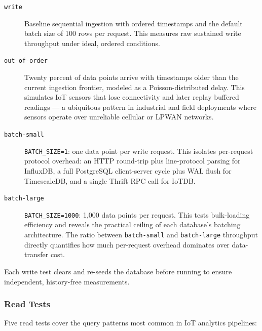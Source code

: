 \begin{description}
  \item[\texttt{write}] Baseline sequential ingestion with ordered timestamps and the
  default batch size of 100 rows per request. This measures raw sustained write throughput
  under ideal, ordered conditions.

  \item[\texttt{out-of-order}] Twenty percent of data points arrive with timestamps older
  than the current ingestion frontier, modeled as a Poisson-distributed delay. This simulates
  IoT sensors that lose connectivity and later replay buffered readings --- a ubiquitous
  pattern in industrial and field deployments where sensors operate over unreliable cellular
  or LPWAN networks.

  \item[\texttt{batch-small}] \texttt{BATCH\_SIZE=1}: one data point per write request.
  This isolates per-request protocol overhead: an HTTP round-trip plus line-protocol parsing
  for InfluxDB, a full PostgreSQL client-server cycle plus WAL flush for TimescaleDB, and a
  single Thrift RPC call for IoTDB.

  \item[\texttt{batch-large}] \texttt{BATCH\_SIZE=1000}: 1{,}000 data points per request.
  This tests bulk-loading efficiency and reveals the practical ceiling of each database's
  batching architecture. The ratio between \texttt{batch-small} and \texttt{batch-large}
  throughput directly quantifies how much per-request overhead dominates over data-transfer cost.
\end{description}

Each write test clears and re-seeds the database before running to ensure independent,
history-free measurements.

\subsubsection{Read Tests}

Five read tests cover the query patterns most common in IoT analytics pipelines:

